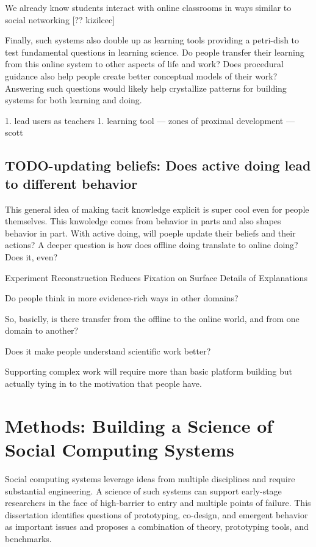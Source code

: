 We already know students interact with online classrooms in ways similar to social networking [?? kizilcec]

Finally, such systems also double up as learning tools providing a petri-dish to test fundamental questions in learning science. Do people transfer their learning from this online system to other aspects of life and work? Does procedural guidance also help people create better conceptual models of their work? Answering such questions would likely help crystallize patterns for building systems for both learning and doing.

1. lead users as teachers
    1. learning tool — zones of proximal development — scott


\subsection{TODO-updating beliefs: Does active doing lead to different behavior}
This general idea of making tacit knowledge explicit is super cool even for people themselves. This knwoledge comes from behavior in parts and also shapes behavior in part. With active doing, will poeple update their beliefs and their actions? A deeper question is how does offline doing translate to online doing? Does it, even?

Experiment Reconstruction Reduces Fixation on Surface Details of Explanations

Do people think in more evidence-rich ways in other domains?

So, basiclly, is there transfer from the offline to the online world, and from one domain to another?

Does it make people understand scientific work better?

Supporting complex work will require more than basic platform building but actually tying in to the motivation that people have.


\section{Methods: Building a Science of Social Computing Systems}

Social computing systems leverage ideas from multiple disciplines and require substantial engineering. A science of such systems can support early-stage researchers in the face of high-barrier to entry and multiple points of failure. This dissertation identifies questions of prototyping, co-design, and emergent behavior as important issues and proposes a combination of theory, prototyping tools, and benchmarks. 

